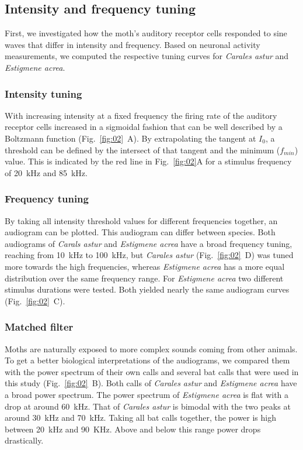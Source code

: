\documentclass[12pt,a4paper]{article}
\newcommand{\species}[1]{\textit{#1}}
\newcommand{\fig}[2]{(Fig.~#1~#2)}
\begin{document}
\subsection{Intensity and frequency tuning}
First, we investigated how the moth's auditory receptor cells responded to sine waves that differ in intensity and frequency. Based on neuronal activity measurements, we computed the respective tuning curves for \species{Carales astur} and \species{Estigmene acrea}.  

\subsubsection{Intensity tuning}
With increasing intensity at a fixed frequency the firing rate of the auditory receptor cells increased in a sigmoidal fashion that can be well described by a Boltzmann function \fig{\ref{fig:02}}{A}. By extrapolating the tangent at $I_{0}$, a threshold can be defined by the intersect of that tangent and the minimum ($f_{min}$) value. This is indicated by the red line in Fig.~\ref{fig:02}{A} for a stimulus frequency of 20~kHz and 85~kHz.  

\subsubsection{Frequency tuning}
By taking all intensity threshold values for different frequencies together, an audiogram can be plotted. This audiogram can differ between species. Both audiograms of \species{Carals astur} and \species{Estigmene acrea} have a broad frequency tuning, reaching from 10~kHz to 100~kHz, but \species{Carales astur} \fig{\ref{fig:02}}{D} was tuned more towards the high frequencies, whereas \species{Estigmene acrea} has a more equal distribution over the same frequency range. For \species{Estigmene acrea} two different stimulus durations were tested. Both yielded nearly the same audiogram curves \fig{\ref{fig:02}}{C}.
 
\subsubsection{Matched filter}
Moths are naturally exposed to more complex sounds coming from other animals. To get a better biological interpretations of the audiograms, we compared them with the power spectrum of their own calls and several bat calls that were used in this study \fig{\ref{fig:02}}{B}. Both calls of \species{Carales astur} and \species{Estigmene acrea} have a broad power spectrum. The power spectrum of \species{Estigmene acrea} is flat with a drop at around 60~kHz. That of \species{Carales astur} is bimodal with the two peaks at around 30~kHz and 70~kHz. Taking all bat calls together, the power is high between 20~kHz and 90~KHz. Above and below this range power drops drastically.
\end{document}
